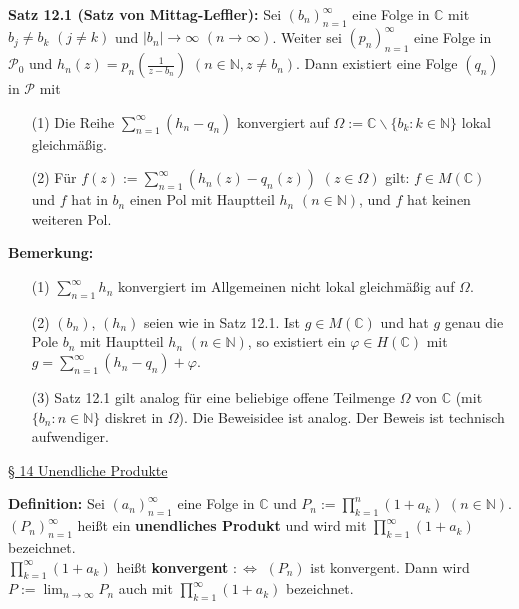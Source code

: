 \documentclass[11pt]{article}
\newcommand{\C}{\mathbb{C}}
\newcommand{\N}{\mathbb{N}}
\begin{document}
\textbf{Satz 12.1 (Satz von Mittag-Leffler):} Sei $(b_n)_{n=1}^\infty$ eine Folge in $\C$ mit $b_j \neq b_k$ $(j \neq k)$ und $|b_n| \to \infty$ $(n \to \infty)$. Weiter sei $(p_n)_{n=1}^\infty$ eine Folge in $\mathcal{P}_0$ und $h_n(z) = p_n(\frac{1}{z - b_n})$ $(n \in \N, z \neq b_n)$. Dann existiert eine Folge $(q_n)$ in $\mathcal{P}$ mit
\vspace{-0.6cm}
\begin{itemize}
\item[(1)] Die Reihe $\sum_{n=1}^\infty (h_n - q_n)$ konvergiert auf $\Omega := \C \backslash \{ b_k \colon k\in \N \}$ lokal gleichmäßig. \vspace{-0.2cm}
\item[(2)] Für $f(z) := \sum_{n=1}^\infty (h_n(z) - q_n(z))$ $(z \in \Omega)$ gilt: $f \in M(\C)$ und $f$ hat in $b_n$ einen Pol mit Hauptteil $h_n$ $(n \in \N)$, und $f$ hat keinen weiteren Pol.
\end{itemize}
\vspace{-0.3cm}

\textbf{Bemerkung:}
\vspace{-0.6cm}
\begin{itemize}
\item[(1)] $\sum_{n=1}^\infty h_n$ konvergiert im Allgemeinen nicht lokal gleichmäßig auf $\Omega$. \vspace{-0.2cm}
\item[(2)] $(b_n)$, $(h_n)$ seien wie in Satz 12.1. Ist $g \in M(\C)$ und hat $g$ genau die Pole $b_n$ mit Hauptteil $h_n$ $(n \in \N)$, so existiert ein $\varphi \in H(\C)$ mit $g = \sum_{n=1}^\infty (h_n - q_n) + \varphi$. \vspace{-0.2cm}
\item[(3)] Satz 12.1 gilt analog für eine beliebige offene Teilmenge $\Omega$ von $\C$ (mit $\{ b_n \colon n \in \N \}$ diskret in $\Omega$). Die Beweisidee ist analog. Der Beweis ist technisch aufwendiger. 
\end{itemize}
\vspace{-0.3cm}

\underline{§ 14 Unendliche Produkte}

\textbf{Definition:} Sei $(a_n)_{n=1}^\infty$ eine Folge in $\C$ und $P_n := \prod_{k = 1}^n (1 + a_k)$ $(n \in \N)$. $(P_n)_{n=1}^\infty$ heißt ein \textbf{unendliches Produkt} und wird mit $\prod_{k = 1}^\infty (1 + a_k)$ bezeichnet. \\
$\prod_{k = 1}^\infty (1 + a_k)$ heißt \textbf{konvergent} $: \Leftrightarrow$ $(P_n)$ ist konvergent. Dann wird $P := \lim_{n \to \infty} P_n$ auch mit $\prod_{k = 1}^\infty (1 + a_k)$ bezeichnet.
\end{document}
